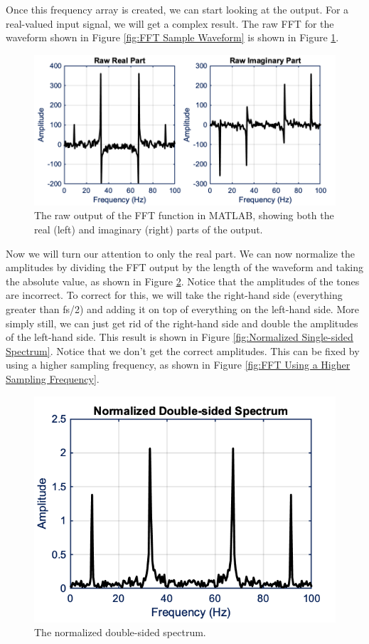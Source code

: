 Once this frequency array is created, we can start looking at the output.
For a real-valued input signal, we will get a complex result.
The raw FFT for the waveform shown in Figure \ref{fig:FFT Sample Waveform} is shown in Figure \ref{fig:Raw FFT Output}.

\begin{figure}[H]
    \centering
    \includegraphics[width = 6 in]{Chapters/Signal Processing/Figures/Raw FFT Output.png}
    \caption{The raw output of the FFT function in MATLAB, showing both the real (left) and imaginary (right) parts of the output.}
    \label{fig:Raw FFT Output}
\end{figure}

Now we will turn our attention to only the real part.
We can now normalize the amplitudes by dividing the FFT output by the length of the waveform and taking the absolute value, as shown in Figure \ref{fig:Normalized Double-sided Spectrum}.
Notice that the amplitudes of the tones are incorrect.
To correct for this, we will take the right-hand side (everything greater than fs/2) and adding it on top of everything on the left-hand side.
More simply still, we can just get rid of the right-hand side and double the amplitudes of the left-hand side.
This result is shown in Figure \ref{fig:Normalized Single-sided Spectrum}.
Notice that we don't get the correct amplitudes. This can be fixed by using a higher sampling frequency, as shown in Figure \ref{fig:FFT Using a Higher Sampling Frequency}.

\begin{figure}[H]
    \centering
    \includegraphics[width = 4 in]{Chapters/Signal Processing/Figures/Normalized Double-sided Spectrum.png}
    \caption{The normalized double-sided spectrum.}
    \label{fig:Normalized Double-sided Spectrum}
\end{figure}

